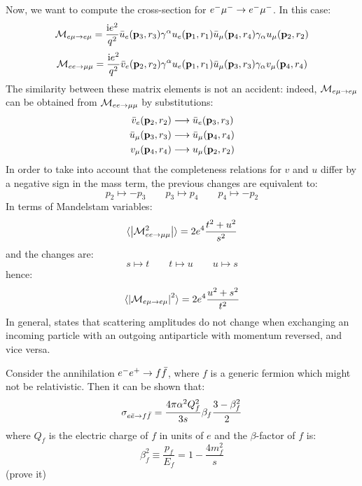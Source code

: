 Now, we want to compute the cross-section for $ e^- \mu^- \rightarrow e^- \mu^- $. In this case:
\begin{equation*}
  \mathcal{M}_{e\mu \rightarrow e\mu} = \frac{\mathrm{i} e^2}{q^2} \bar{u}_e(\mathbf{p}_3 , r_3) \gamma^\alpha u_e(\mathbf{p}_1 , r_1) \bar{u}_\mu(\mathbf{p}_4 ,r_4) \gamma_\alpha u_\mu(\mathbf{p}_2 , r_2)
\end{equation*}
\begin{equation*}
  \mathcal{M}_{ee \rightarrow \mu\mu} = \frac{\mathrm{i} e^2}{q^2} \bar{v}_e(\mathbf{p}_2 , r_2) \gamma^\alpha u_e(\mathbf{p}_1 , r_1) \bar{u}_\mu(\mathbf{p}_3 , r_3) \gamma_\alpha v_\mu(\mathbf{p}_4 , r_4)
\end{equation*}
The similarity between these matrix elements is not an accident: indeed, $ \mathcal{M}_{e\mu \rightarrow e\mu} $ can be obtained from $ \mathcal{M}_{ee \rightarrow \mu\mu} $ by substitutions:
\begin{align*}
  \bar{v}_e(\mathbf{p}_2 , r_2) &\longrightarrow \bar{u}_e(\mathbf{p}_3 , r_3)
  \\
  \bar{u}_\mu(\mathbf{p}_3 , r_3) &\longrightarrow \bar{u}_\mu(\mathbf{p}_4 , r_4)
  \\
  v_\mu(\mathbf{p}_4 , r_4) &\longrightarrow u_\mu(\mathbf{p}_2 , r_2)
\end{align*}
In order to take into account that the completeness relations for $ v $ and $ u $ differ by a negative sign in the mass term, the previous changes are equivalent to:
\begin{equation}
  p_2 \mapsto -p_3
  \qquad
  p_3 \mapsto p_4
  \qquad
  p_4 \mapsto -p_2
\end{equation}
In terms of Mandelstam variables:
\begin{equation}
  \braket{\left\lvert\mathcal{M}_{ee \rightarrow \mu\mu}^2\right\rvert} = 2e^4 \frac{t^2 + u^2}{s^2}
\end{equation}
and the changes are:
\begin{equation}
  s \mapsto t
  \qquad
  t \mapsto u
  \qquad
  u \mapsto s
\end{equation}
hence:
\begin{equation}
  \braket{\left\lvert\mathcal{M}_{e\mu \rightarrow e\mu}\right\rvert^2} = 2e^4 \frac{u^2 + s^2}{t^2}
\end{equation}
In general,  states that scattering amplitudes do not change when exchanging an incoming particle with an outgoing antiparticle with momentum reversed, and vice versa.

Consider the annihilation $ e^- e^+ \rightarrow f \bar{f} $, where $ f $ is a generic fermion which might not be relativistic. Then it can be shown that:
\begin{equation}
  \sigma_{e\bar{e} \rightarrow f\bar{f}} = \frac{4\pi\alpha^2 Q_f^2}{3s} \beta_f \frac{3 - \beta_f^2}{2}
\end{equation}
where $ Q_f $ is the electric charge of $ f $ in units of $ e $ and the $ \beta $-factor of $ f $ is:
\begin{equation}
  \beta_f^2 \equiv \frac{p_f}{E_f} = 1 - \frac{4m_f^2}{s}
\end{equation}
(prove it)

